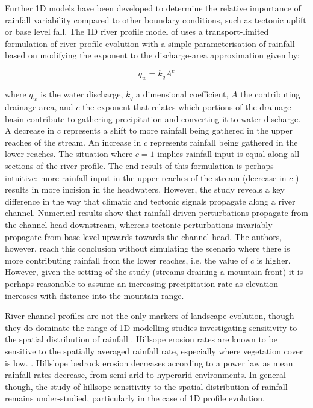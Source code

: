 Further 1D models have been developed to determine the relative importance of rainfall variability compared to other boundary conditions, such as tectonic uplift or base level fall. The 1D river profile model of \citet{Wobus2010} uses a transport-limited formulation of river profile evolution \citep{meyer1948formulas} with a simple parameterisation of rainfall based on modifying the exponent to the discharge-area approximation given by:

\begin{equation}
q_w = k_qA^c
\end{equation}

\noindent
where \(q_w\) is the water discharge, \(k_q\) a dimensional coefficient, \(A\) the contributing drainage area, and \(c\) the exponent that relates which portions of the drainage basin contribute to gathering precipitation and converting it to water discharge. A decrease in \(c\) represents a shift to more rainfall being gathered in the upper reaches of the stream. An increase in \(c\) represents rainfall being gathered in the lower reaches. The situation where \(c = 1\) implies rainfall input is equal along all sections of the river profile. The end result of this formulation is perhaps intuitive: more rainfall input in the upper reaches of the stream (decrease in \(c\) ) results in more incision in the headwaters. However, the study reveals a key difference in the way that climatic and tectonic signals propagate along a river channel. Numerical results show that rainfall-driven perturbations propagate from the channel head downstream, whereas tectonic perturbations invariably propagate from base-level upwards towards the channel head. The authors, however, reach this conclusion without simulating the scenario where there is more contributing rainfall from the lower reaches, i.e. the value of \(c\) is higher. However, given the setting of the study (streams draining a mountain front) it is perhaps reasonable to assume an increasing precipitation rate as elevation increases with distance into the mountain range.

River channel profiles are not the only markers of landscape evolution, though they do dominate the range of 1D modelling studies investigating sensitivity to the spatial distribution of rainfall \citep{Tucker2010}. Hillsope erosion rates are known to be sensitive to the spatially averaged rainfall rate, especially where vegetation cover is low. \citep{Owen2011}. Hillslope bedrock erosion decreases according to a power law as mean rainfall rates decrease, from semi-arid to hyperarid environments. In general though, the study of hillsope sensitivity to the spatial distribution of rainfall remains under-studied, particularly in the case of 1D profile evolution.

